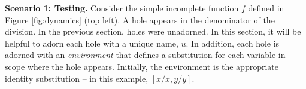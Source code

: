 
\noindent\textbf{Scenario 1: Testing.} Consider the simple incomplete function $f$ defined in Figure \ref{fig:dynamics} (top left).  
%
A hole appears in the denominator of the division. In the previous section,
holes were unadorned. In this section, it will be helpful to adorn each hole with a unique name, $u$. In addition, each hole is adorned with an \emph{environment} that defines a substitution for each variable in scope
where the hole appears. Initially, the environment is the appropriate identity substitution -- in this example, $[x/x, y/y]$. 

